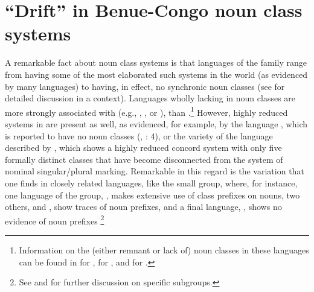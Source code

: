 \documentclass[output=paper ,collection	  ,collectionchapter ,biblatexbackend=biber   ]{langscibook}
\begin{document}
\section{``Drift'' in Benue-Congo noun class systems \label{Drift}}\label{sec:good:2}

A remarkable fact about  noun class systems is that languages of the
family range from having some of the most elaborated such systems in the world
(as evidenced by many  languages) to having, in effect, no synchronic noun
classes (see  for detailed discussion in a 
context). Languages wholly lacking in noun classes are more strongly associated
with  (e.g., , , or ), than .{\footnote{Information on the (either remnant or lack of) noun
classes in these  languages can be found in
 for , 
for , and  for .}} However, highly
reduced systems in  are present as well, as evidenced, for 
example, by the  language , which is reported to have no noun classes
(, : 4), or the 
variety of the  language  described by
, which shows a highly reduced concord system with only
five formally distinct classes that have become disconnected from the system of
nominal singular/plural marking. Remarkable in this regard is the variation that
one finds in closely related languages, like the small 
group, where, for instance, one language of the group, , makes extensive
use of class prefixes on nouns, two others,  and , show traces of noun
prefixes, and a final language, , shows no evidence of noun prefixes
\cite[436--440]{Williamson1985} {\footnote{See
 and
 for further discussion on specific 
subgroups.}}
\end{document}
